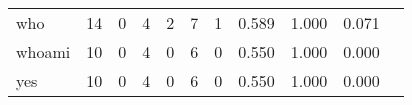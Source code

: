 \begin{longtable}{lp{1.20cm}p{1.20cm}p{1.20cm}p{1.20cm}p{1.20cm}p{1.20cm}p{1.20cm}p{1.20cm}p{1.20cm}p{1.20cm}}
who       &                                    14 &                                                  0 &                                                  4 &                                                  2 &                                                  7 &                                                  1 &                                         0.589 &                                              1.000 &                                              0.071 \\
whoami    &                                    10 &                                                  0 &                                                  4 &                                                  0 &                                                  6 &                                                  0 &                                         0.550 &                                              1.000 &                                              0.000 \\
yes       &                                    10 &                                                  0 &                                                  4 &                                                  0 &                                                  6 &                                                  0 &                                         0.550 &                                              1.000 &                                              0.000 \\
\end{longtable}
